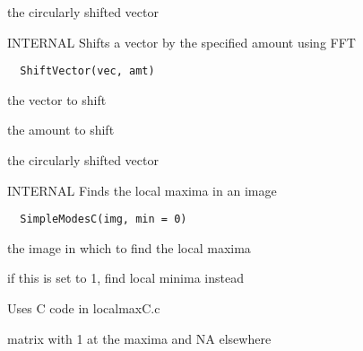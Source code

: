 \documentclass[a4paper]{book}
\begin{document}
%
\begin{Value}
the circularly shifted vector
\end{Value}
%
\begin{Description}\relax
INTERNAL Shifts a vector by the specified amount using
FFT
\end{Description}
%
\begin{Usage}
\begin{verbatim}
  ShiftVector(vec, amt)
\end{verbatim}
\end{Usage}
%
\begin{Arguments}
\begin{ldescription}
\item[\code{vec}] the vector to shift

\item[\code{amt}] the amount to shift
\end{ldescription}
\end{Arguments}
%
\begin{Value}
the circularly shifted vector
\end{Value}
%
\begin{Description}\relax
INTERNAL Finds the local maxima in an image
\end{Description}
%
\begin{Usage}
\begin{verbatim}
  SimpleModesC(img, min = 0)
\end{verbatim}
\end{Usage}
%
\begin{Arguments}
\begin{ldescription}
\item[\code{img}] the image in which to find the local maxima

\item[\code{min}] if this is set to 1, find local minima
instead
\end{ldescription}
\end{Arguments}
%
\begin{Details}\relax
Uses C code in localmaxC.c
\end{Details}
%
\begin{Value}
matrix with 1 at the maxima and NA elsewhere
\end{Value}
\end{document}
